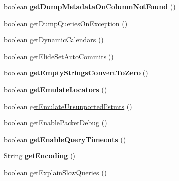\begin{DoxyCompactItemize}
boolean {\bfseries get\+Dump\+Metadata\+On\+Column\+Not\+Found} ()
\item 
boolean \mbox{\hyperlink{classcom_1_1mysql_1_1jdbc_1_1jdbc2_1_1optional_1_1_connection_wrapper_a21a6730d44ced20d8242a8adaae34364}{get\+Dump\+Queries\+On\+Exception}} ()
\item 
boolean \mbox{\hyperlink{classcom_1_1mysql_1_1jdbc_1_1jdbc2_1_1optional_1_1_connection_wrapper_a0b2ae292dd1bf086fa44c57a0cc34264}{get\+Dynamic\+Calendars}} ()
\item 
boolean \mbox{\hyperlink{classcom_1_1mysql_1_1jdbc_1_1jdbc2_1_1optional_1_1_connection_wrapper_a764dc2884e41a1c01956ef80e7ed578a}{get\+Elide\+Set\+Auto\+Commits}} ()
\item 
\mbox{\label{classcom_1_1mysql_1_1jdbc_1_1jdbc2_1_1optional_1_1_connection_wrapper_a765a9fa90588474effa5ddb69435be26}} 
boolean {\bfseries get\+Empty\+Strings\+Convert\+To\+Zero} ()
\item 
\mbox{\label{classcom_1_1mysql_1_1jdbc_1_1jdbc2_1_1optional_1_1_connection_wrapper_ab9e7c319f719453c77b548242a7e3a4d}} 
boolean {\bfseries get\+Emulate\+Locators} ()
\item 
boolean \mbox{\hyperlink{classcom_1_1mysql_1_1jdbc_1_1jdbc2_1_1optional_1_1_connection_wrapper_a778c594d3f6f04b555615834c7287ac3}{get\+Emulate\+Unsupported\+Pstmts}} ()
\item 
boolean \mbox{\hyperlink{classcom_1_1mysql_1_1jdbc_1_1jdbc2_1_1optional_1_1_connection_wrapper_a461ba0551d56c29d54b68ea0f12a875d}{get\+Enable\+Packet\+Debug}} ()
\item 
\mbox{\label{classcom_1_1mysql_1_1jdbc_1_1jdbc2_1_1optional_1_1_connection_wrapper_a20b305bf1bf7697009ecc8f57e421dda}} 
boolean {\bfseries get\+Enable\+Query\+Timeouts} ()
\item 
\mbox{\label{classcom_1_1mysql_1_1jdbc_1_1jdbc2_1_1optional_1_1_connection_wrapper_ac1336c31f75e5ae081c31d91e35845ca}} 
String {\bfseries get\+Encoding} ()
\item 
boolean \mbox{\hyperlink{classcom_1_1mysql_1_1jdbc_1_1jdbc2_1_1optional_1_1_connection_wrapper_adc6ad75acb4cedeadb60e9676687734e}{get\+Explain\+Slow\+Queries}} ()

\end{DoxyCompactItemize}
